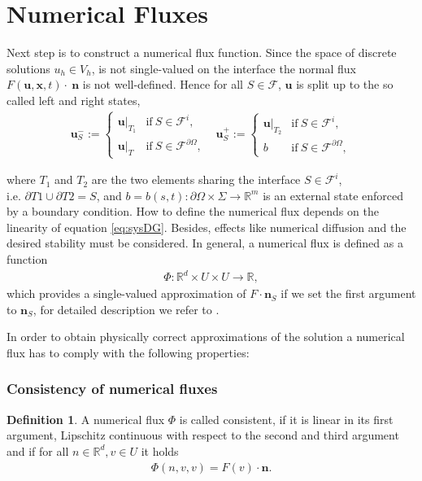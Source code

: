 \documentclass[a4paper,12pt]{article}
\theoremstyle{definition}
\newtheorem{Def}{Definition}
\theoremstyle{definition}
\begin{document}
\section{Numerical Fluxes}


Next step is to construct a numerical flux function. Since the space of discrete solutions $u_h\in V_h$, is not single-valued on the interface the normal flux $ F(\mathbf{u}, \mathbf{x}, t)\cdot~\mathbf{n} $ is not well-defined.
Hence for all $S \in \mathcal{F}$, $\mathbf{u}$ is split up to the so called left and right states, 
\begin{equation}\label{eq:statesplitting}
\begin{matrix}
\mathbf{u}_S^- := \left\lbrace
\begin{array}{ll}
\mathbf{u}\vert_{T_1} & \mathrm{if}\ S \in \mathcal{F}^i, \\
\mathbf{u}\vert_T & \mathrm{if}\ S \in \mathcal{F}^{\partial \Omega},
\end{array} \right.
& \mathbf{u}_S^+ := \left\lbrace
\begin{array}{ll}
\mathbf{u}\vert_{T_2} & \mathrm{if}\ S \in \mathcal{F}^i, \\
b & \mathrm{if}\ S \in \mathcal{F}^{\partial \Omega},
\end{array}\right.
\end{matrix}
\end{equation}

where $T_1$ and $T_2$ are the two elements sharing the interface $S \in \mathcal{F}^i$,\\ i.e. \mbox{$\partial T1 \cup \partial T2 = S$},  and \mbox{$b=b(s,t):\partial\Omega\times\Sigma\rightarrow \mathbb{R}^m $} is an external state enforced by a boundary condition.
How to define the numerical flux depends on the linearity of equation \eqref{eq:sysDG}. Besides, effects like numerical diffusion and the desired stability must be considered.
In general, a numerical flux is defined as a function
\begin{align}
\Phi :  \mathbb{R}^d \times U \times U \rightarrow \mathbb{R},
\end{align}
which provides a single-valued approximation of $F \cdot \mathbf{n}_S$ if we set the first argument to $\mathbf{n}_S$, for detailed description we refer to \cite{DiPietro}.

In order to obtain physically correct approximations of the solution a numerical flux has to comply with the following properties:

\subsubsection{Consistency of numerical fluxes}
\begin{Def}\label{def:flux:consistency}
	A numerical flux $\Phi$ is called consistent, if it is linear in its first argument, Lipschitz continuous with respect to the second and third argument and if for all $n\in \mathbb{R}^d, v\in U$ it holds
	\begin{align}
	\Phi(n,v,v) = F(v)\cdot \mathbf{n}.
	\end{align}
\end{Def}
\end{document}

